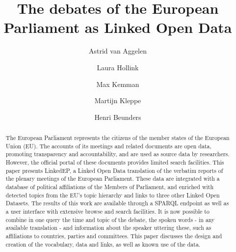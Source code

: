 \documentclass[runningheads,a4paper]{llncs}
\begin{document}
\mainmatter

\title{The debates of the European Parliament as Linked Open Data}
\author{Astrid van Aggelen \and
Laura Hollink \and
Max Kemman \and
Martijn Kleppe \and
Henri Beunders}
\maketitle

\begin{abstract}
The European Parliament represents the citizens of the member states of the European Union (EU). The accounts of its meetings and related documents are open data, promoting transparency and accountability, and are used as source data by researchers. However, the official portal of these documents provides limited search facilities. This paper presents LinkedEP, a Linked Open Data translation of the verbatim reports of the plenary meetings of the European Parliament. These data are integrated with a database of political affiliations of the Members of Parliament, and enriched with detected topics from the EU's topic hierarchy and links to three other Linked Open Datasets. The results of this work are available through a SPARQL endpoint as well as a user interface with extensive browse and search facilities. It is now possible to combine in one query the time and topic of the debate, the spoken words - in any available translation - and information about the speaker uttering these, such as affiliations to countries, parties and committees. This paper discusses the design and creation of the vocabulary, data and links, as well as known use of the data.

\end{abstract}
\end{document}
